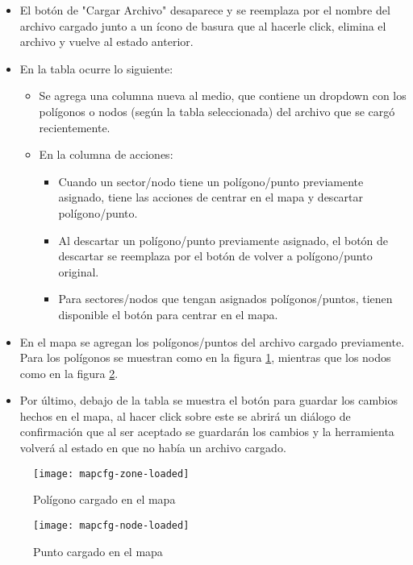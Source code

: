 \begin{itemize}
    \item El botón de "Cargar Archivo" desaparece y se reemplaza por el nombre del archivo cargado junto a un ícono de basura que al hacerle click, elimina el archivo y vuelve al estado anterior.
    \item En la tabla ocurre lo siguiente:
    \begin{itemize}
        \item Se agrega una columna nueva al medio, que contiene un dropdown con los polígonos o nodos (según la tabla seleccionada) del archivo que se cargó recientemente.
        \item En la columna de acciones:
        \begin{itemize}        
            \item Cuando un sector/nodo tiene un polígono/punto previamente asignado, tiene las acciones de centrar en el mapa y descartar polígono/punto.
            \item Al descartar un polígono/punto previamente asignado, el botón de descartar se reemplaza por el botón de volver a polígono/punto original.
            \item Para sectores/nodos que tengan asignados polígonos/puntos, tienen disponible el botón para centrar en el mapa.
        \end{itemize}
    \end{itemize}
    \item En el mapa se agregan los polígonos/puntos del archivo cargado previamente. Para los polígonos se muestran como en la figura \ref{fig:mapcfg-zone-loaded}, mientras que los nodos como en la figura \ref{fig:mapcfg-node-loaded}.
    \item Por último, debajo de la tabla se muestra el botón para guardar los cambios hechos en el mapa, al hacer click sobre este se abrirá un diálogo de confirmación que al ser aceptado se guardarán los cambios y la herramienta volverá al estado en que no había un archivo cargado.
\end{itemize}

\begin{figure}[H]
	\centering
	\texttt{[image: mapcfg-zone-loaded]}
	\caption{\label{fig:mapcfg-zone-loaded} Polígono cargado en el mapa}
\end{figure}

\begin{figure}[H]
	\centering
	\texttt{[image: mapcfg-node-loaded]}
	\caption{\label{fig:mapcfg-node-loaded} Punto cargado en el mapa}
\end{figure}

